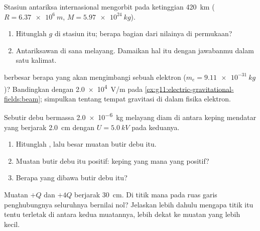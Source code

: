 \begin{exercise}[$\star\star$]\label{exo:g11:electric-gravitational-fields:6}
Stasiun antariksa internasional mengorbit pada ketinggian \qty{420}{km}
($R = \qty{6.37e6}{m}$, $M = \qty{5.97e24}{kg}$).
\begin{enumerate}
  \item Hitunglah $g$ di stasiun itu; berapa bagian dari nilainya di
        permukaan?
  \item Antariksawan di sana melayang. Damaikan hal itu dengan
        jawabanmu dalam satu kalimat.
\end{enumerate}
\end{exercise}

\begin{exercise}[$\star\star$]\label{exo:g11:electric-gravitational-fields:7}
 berbesar berapa yang akan mengimbangi  sebuah elektron
($m_e = \qty{9.11e-31}{kg}$)? Bandingkan dengan \qty{2.0e4}{V/m} pada
\cref{ex:g11:electric-gravitational-fields:beam}; simpulkan tentang
tempat gravitasi di dalam fisika elektron.
\end{exercise}

\begin{exercise}[$\star\star$]\label{exo:g11:electric-gravitational-fields:8}
Sebutir debu bermassa \qty{2.0e-6}{kg} melayang diam di antara keping
mendatar yang berjarak \qty{2.0}{cm} dengan $U = \qty{5.0}{kV}$ pada
keduanya.
\begin{enumerate}
  \item Hitunglah , lalu besar muatan butir debu itu.
  \item Muatan butir debu itu positif: keping yang mana yang positif?
  \item Berapa  yang dibawa butir debu itu?
\end{enumerate}
\end{exercise}

\begin{exercise}[$\star\star$]\label{exo:g11:electric-gravitational-fields:9}
Muatan $+Q$ dan $+4Q$ berjarak \qty{30}{cm}. Di titik mana pada ruas
garis penghubungnya  seluruhnya bernilai nol? Jelaskan lebih dahulu
mengapa titik itu tentu terletak di antara kedua muatannya, lebih dekat
ke muatan yang lebih kecil.
\end{exercise}

